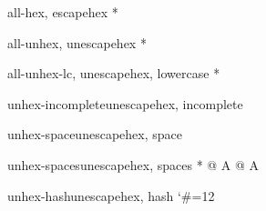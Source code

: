 \RequirePackage{pdfescape}

\begin{qstest}{all-hex}{\AllBytes, escapehex}
  \EdefEscapeHex\x{\AllBytes}%
  \Expect*{\x}*{\AllBytesHex}%
  \ExpectVar\x\AllBytesHex
\end{qstest}

\begin{qstest}{all-unhex}{\AllBytesHex, unescapehex}
  \EdefUnescapeHex\x{\AllBytesHex}%
  \Expect*{\x}*{\AllBytes}%
  \ExpectVar\x\AllBytes
\end{qstest}

\begin{qstest}{all-unhex-lc}{\AllBytesHexLC, unescapehex, lowercase}
  \EdefUnescapeHex\x{\AllBytesHexLC}%
  \Expect*{\x}*{\AllBytes}%
  \ExpectVar\x\AllBytes
\end{qstest}

\begin{qstest}{unhex-incomplete}{unescapehex, incomplete}
  \EdefUnescapeHex{}%
\end{qstest}

\begin{qstest}{unhex-space}{unescapehex, space}
  \EdefUnescapeHex{}%
  \Expect*{\x}{ }%
  \ExpectVar\x\space
\end{qstest}

\begin{qstest}{unhex-spaces}{unescapehex, spaces}
  \EdefUnescapeHex{}%
  \def\y#1{%
    \edef\z{#1\string @#1#1\string A#1}%
  }\y{ }%
  \Expect*{\x}*{\z}%
  \ExpectVar\x\z
\end{qstest}

\begin{qstest}{unhex-hash}{unescapehex, hash}
  \catcode`\#=12 %
  \EdefUnescapeHex{}%
  \ExpectVar\x\space
\end{qstest}


